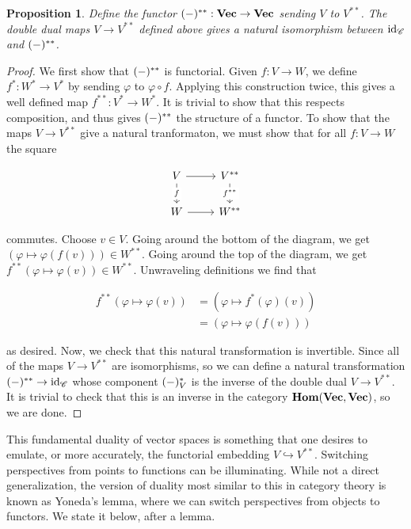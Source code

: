 \documentclass{article}
\newtheorem{proposition}{Proposition}[section]
\theoremstyle{definition}
\numberwithin{figure}{section}
\begin{document}
\begin{proposition} Define the functor $(\--)^{**}: \bold{Vec} \to \bold{Vec}$ sending $V$ to $V^{**}$. The double dual maps $V\to V^{**}$ defined above gives a natural isomorphism between $\mathrm{id}_{\mathscr{C}}$ and $(\--)^{**}$.
\end{proposition}
\begin{proof} We first show that $(\--)^{**}$ is functorial. Given $f:V\to W$, we define $f^{*}:W^{*}\to V^{*}$ by sending $\varphi$ to $\varphi \circ f$. Applying this construction twice, this gives a well defined map $f^{**}:V^*\to W^{*}$. It is trivial to show that this respects composition, and thus gives $(\--)^{**}$ the structure of a functor. To show that the maps $V\to V^{**}$ give a natural tranformaton, we must show that for all $f:V\to W$ the square

\[\begin{tikzcd}
	V & {V^{**}} \\
	W & {W^{**}}
	\arrow["f"{description}, from=1-1, to=2-1]
	\arrow["{f^{**}}"{description}, from=1-2, to=2-2]
	\arrow[from=1-1, to=1-2]
	\arrow[from=2-1, to=2-2]
\end{tikzcd}\]

commutes. Choose $v\in V$. Going around the bottom of the diagram, we get $(\varphi \mapsto \varphi(f(v)))\in W^{**}$. Going around the top of the diagram, we get $f^{**}(\varphi\mapsto \varphi(v))\in W^{**}$. Unwraveling definitions we find that

\begin{align*}
f^{**}(\varphi\mapsto \varphi(v))&=\left(\varphi\mapsto f^{*}(\varphi)(v)\right)\\
&=\left(\varphi\mapsto \varphi(f(v))\right)
\end{align*}

as desired. Now, we check that this natural transformation is invertible. Since all of the maps $V\to V^{**}$ are isomorphisms, so we can define a natural transformation $(\--)^{**}\to\mathrm{id}_{\mathscr{C}}$ whose component $(\--)^{\**}_{V}$ is the inverse of the double dual $V\to V^{**}$. It is trivial to check that this is an inverse in the category $\bold{Hom}(\bold{Vec},\bold{Vec})$, so we are done.
\end{proof}

This fundamental duality of vector spaces is something that one desires to emulate, or more accurately, the functorial embedding $V\hookrightarrow{}V^{**}$. Switching perspectives from points to functions can be illuminating. While not a direct generalization, the version of duality most similar to this in category theory is known as Yoneda's lemma, where we can switch perspectives from objects to functors. We state it below, after a lemma.
\end{document}
